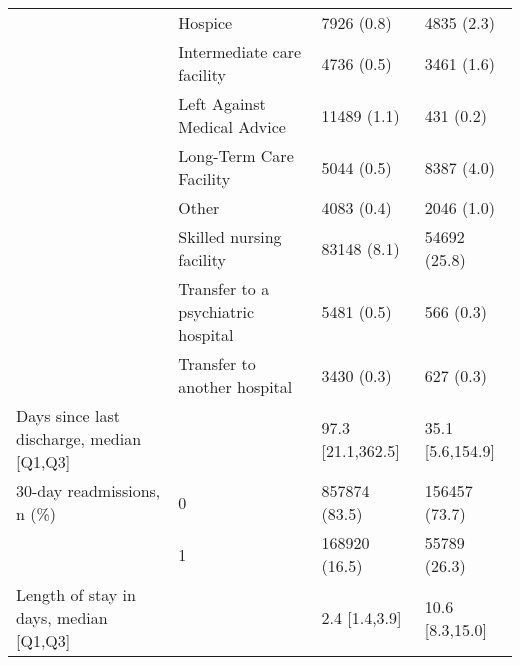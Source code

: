 \begin{tabular}{llll}
                                       & Hospice &                            7926 (0.8) &        4835 (2.3) \\
                                       & Intermediate care facility &                            4736 (0.5) &        3461 (1.6) \\
                                       & Left Against Medical Advice &                           11489 (1.1) &         431 (0.2) \\
                                       & Long-Term Care Facility &                            5044 (0.5) &        8387 (4.0) \\
                                       & Other &                            4083 (0.4) &        2046 (1.0) \\
                                       & Skilled nursing facility &                           83148 (8.1) &      54692 (25.8) \\
                                       & Transfer to a psychiatric hospital &                            5481 (0.5) &         566 (0.3) \\
                                       & Transfer to another hospital &                            3430 (0.3) &         627 (0.3) \\
Days since last discharge, median [Q1,Q3] &   &                     97.3 [21.1,362.5] &  35.1 [5.6,154.9] \\
30-day readmissions, n (\%) & 0 &                         857874 (83.5) &     156457 (73.7) \\
                                       & 1 &                         168920 (16.5) &      55789 (26.3) \\
Length of stay in days, median [Q1,Q3] &   &                         2.4 [1.4,3.9] &   10.6 [8.3,15.0] \\
\bottomrule
\end{tabular}
